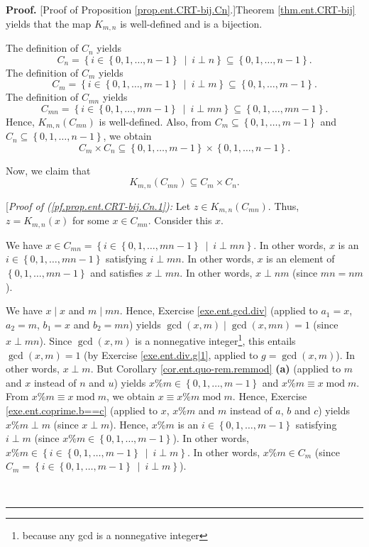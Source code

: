 \documentclass[numbers=enddot,12pt,final,onecolumn,notitlepage]{scrartcl}%
\numberwithin{exer}{subsection}
\theoremstyle{definition}
\newenvironment{proof}[1][Proof]{\noindent\textbf{#1.} }{\ \rule{0.5em}{0.5em}}
\begin{document}
\begin{proof}
[Proof of Proposition \ref{prop.ent.CRT-bij.Cn}.]Theorem \ref{thm.ent.CRT-bij}
yields that the map $K_{m,n}$ is well-defined and is a bijection.

The definition of $C_{n}$ yields%
\[
C_{n}=\left\{  i\in\left\{  0,1,\ldots,n-1\right\}  \ \mid\ i\perp n\right\}
\subseteq\left\{  0,1,\ldots,n-1\right\}  .
\]
The definition of $C_{m}$ yields%
\[
C_{m}=\left\{  i\in\left\{  0,1,\ldots,m-1\right\}  \ \mid\ i\perp m\right\}
\subseteq\left\{  0,1,\ldots,m-1\right\}  .
\]
The definition of $C_{mn}$ yields
\[
C_{mn}=\left\{  i\in\left\{  0,1,\ldots,mn-1\right\}  \ \mid\ i\perp
mn\right\}  \subseteq\left\{  0,1,\ldots,mn-1\right\}  .
\]
Hence, $K_{m,n}\left(  C_{mn}\right)  $ is well-defined. Also, from
$C_{m}\subseteq\left\{  0,1,\ldots,m-1\right\}  $ and $C_{n}\subseteq\left\{
0,1,\ldots,n-1\right\}  $, we obtain
\[
C_{m}\times C_{n}\subseteq\left\{  0,1,\ldots,m-1\right\}  \times\left\{
0,1,\ldots,n-1\right\}  .
\]


Now, we claim that%
\begin{equation}
K_{m,n}\left(  C_{mn}\right)  \subseteq C_{m}\times C_{n}\text{.}
\label{pf.prop.ent.CRT-bij.Cn.1}%
\end{equation}


[\textit{Proof of (\ref{pf.prop.ent.CRT-bij.Cn.1}):} Let $z\in K_{m,n}\left(
C_{mn}\right)  $. Thus, $z=K_{m,n}\left(  x\right)  $ for some $x\in C_{mn}$.
Consider this $x$.

We have $x\in C_{mn}=\left\{  i\in\left\{  0,1,\ldots,mn-1\right\}
\ \mid\ i\perp mn\right\}  $. In other words, $x$ is an $i\in\left\{
0,1,\ldots,mn-1\right\}  $ satisfying $i\perp mn$. In other words, $x$ is an
element of $\left\{  0,1,\ldots,mn-1\right\}  $ and satisfies $x\perp mn$. In
other words, $x\perp nm$ (since $mn=nm$).

We have $x\mid x$ and $m\mid mn$. Hence, Exercise \ref{exe.ent.gcd.div}
(applied to $a_{1}=x$, $a_{2}=m$, $b_{1}=x$ and $b_{2}=mn$) yields
$\gcd\left(  x,m\right)  \mid\gcd\left(  x,mn\right)  =1$ (since $x\perp mn$).
Since $\gcd\left(  x,m\right)  $ is a nonnegative integer\footnote{because any
gcd is a nonnegative integer}, this entails $\gcd\left(  x,m\right)  =1$ (by
Exercise \ref{exe.ent.div.g|1}, applied to $g=\gcd\left(  x,m\right)  $). In
other words, $x\perp m$. But Corollary \ref{cor.ent.quo-rem.remmod}
\textbf{(a)} (applied to $m$ and $x$ instead of $n$ and $u$) yields
$x\%m\in\left\{  0,1,\ldots,m-1\right\}  $ and $x\%m\equiv x\operatorname{mod}%
m$. From $x\%m\equiv x\operatorname{mod}m$, we obtain $x\equiv
x\%m\operatorname{mod}m$. Hence, Exercise \ref{exe.ent.coprime.b==c} (applied
to $x$, $x\%m$ and $m$ instead of $a$, $b$ and $c$) yields $x\%m\perp m$
(since $x\perp m$). Hence, $x\%m$ is an $i\in\left\{  0,1,\ldots,m-1\right\}
$ satisfying $i\perp m$ (since $x\%m\in\left\{  0,1,\ldots,m-1\right\}  $). In
other words, $x\%m\in\left\{  i\in\left\{  0,1,\ldots,m-1\right\}
\ \mid\ i\perp m\right\}  $. In other words, $x\%m\in C_{m}$ (since
$C_{m}=\left\{  i\in\left\{  0,1,\ldots,m-1\right\}  \ \mid\ i\perp m\right\}
$).


\end{proof}
\end{document}
